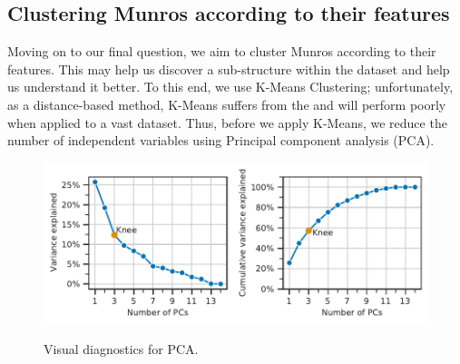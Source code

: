 \documentclass[11pt,a4paper]{article}
\begin{document}
\subsection{Clustering Munros according to their features}
Moving on to our final question, we aim to cluster Munros according to their features. This may help us discover a sub-structure within the dataset and help us understand it better. To this end, we use K-Means Clustering; unfortunately, as a distance-based method, K-Means suffers from the  and will perform poorly when applied to a vast dataset. Thus, before we apply K-Means, we reduce the number of independent variables using Principal component analysis (PCA). 
\begin{figure} [h!]
    \centering
    \includegraphics{report/scree_plot.pdf}
    \begin{minipage}[t]{.5\linewidth}
        \centering
        \label{fds-project-template:fig:scree_plot_def}
    \end{minipage}%
    \begin{minipage}[t]{.5\linewidth}
        \centering
        \label{fds-project-template:fig:scree_plot_cum}
    \end{minipage}
    \caption{Visual diagnostics for PCA.}
    \label{fds-project-template:fig:scree_plot}
\end{figure}

\end{document}
